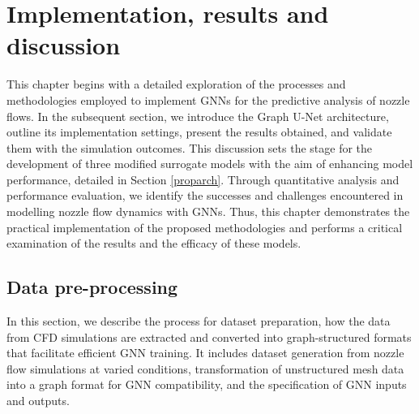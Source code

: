 \chapter{Implementation, results and discussion}
\label{chap:Method}
This chapter begins with a detailed exploration of the processes and methodologies employed to implement GNNs for the predictive analysis of nozzle flows. In the subsequent section, we introduce the Graph U-Net architecture, outline its implementation settings, present the results obtained, and validate them with the simulation outcomes. This discussion sets the stage for the development of three modified surrogate models with the aim of enhancing model performance, detailed in Section \ref{proparch}. Through quantitative analysis and performance evaluation, we identify the successes and challenges encountered in modelling nozzle flow dynamics with GNNs. Thus, this chapter demonstrates the practical implementation of the proposed methodologies and performs a critical examination of the results and the efficacy of these models.
\section{Data pre-processing} \label{prep}
In this section, we describe the process for dataset preparation, how the data from CFD simulations are extracted and converted into graph-structured formats that facilitate efficient GNN training. It includes dataset generation from nozzle flow simulations at varied conditions, transformation of unstructured mesh data into a graph format for GNN compatibility, and the specification of GNN inputs and outputs. 
